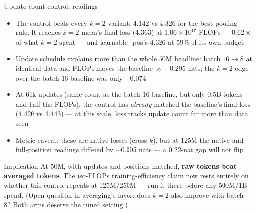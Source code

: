 \documentclass[10pt,aspectratio=169]{beamer}
\newcommand{\bad}[1]{\textcolor{warnred}{#1}}
\begin{document}
\begin{frame}{Update-count control: readings}
  \footnotesize
  \begin{itemize}
    \item \bad{The control beats every $k{=}2$ variant}: 4.142 vs 4.326 for
          the best pooling rule. It reaches $k{=}2$ mean's final loss (4.363)
          at $1.06\times10^{17}$ FLOPs --- $0.62\times$ of what $k{=}2$
          spent --- and learnable+pos's 4.326 at 59\% of its own budget
    \item \bad{Update schedule explains more than the whole 50M headline}:
          batch $16 \to 8$ at identical data and FLOPs moves the baseline by
          $-0.295$ nats; the $k{=}2$ edge over the batch-16 baseline was only
          $-0.074$
    \item At 61k updates (same count as the batch-16 baseline, but only 0.5B
          tokens and half the FLOPs), the control has \emph{already} matched
          the baseline's final loss (4.420 vs 4.443) --- at this scale, loss
          tracks update count far more than data seen
    \item Metric caveat: these are native losses (cross-$k$), but at 125M the
          native and full-position readings differed by $\sim$0.005 nats ---
          a 0.22-nat gap will not flip
  \end{itemize}

  \vspace{0.3em}
  \begin{alertblock}{Implication}
    At 50M, with updates and positions matched, \textbf{raw tokens beat
    averaged tokens}. The iso-FLOPs training-efficiency claim now rests
    entirely on whether this control repeats at 125M/250M --- run it there
    before any 500M/1B spend. (Open question in averaging's favor: does
    $k{=}2$ also improve with batch 8? Both arms deserve the tuned setting.)
  \end{alertblock}
\end{frame}
\end{document}
